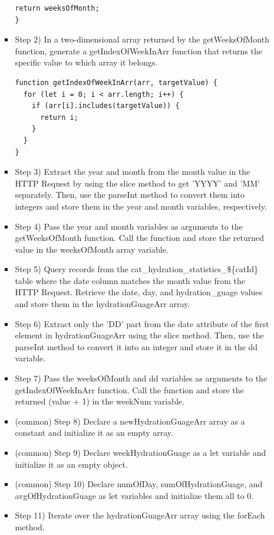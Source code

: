 \documentclass[conference]{IEEEtran}
\begin{document}
\begin{itemize}
\begin{itemize}
\begin{itemize}
\begin{lstlisting}[style=htmlcssjs]
  return weeksOfMonth;
}
            \end{lstlisting}
            \item Step 2) In a two-dimensional array returned by the getWeeksOfMonth function, generate a getIndexOfWeekInArr function that returns the specific value to which array it belongs.
            \begin{lstlisting}[style=htmlcssjs]
function getIndexOfWeekInArr(arr, targetValue) {
  for (let i = 0; i < arr.length; i++) {
    if (arr[i].includes(targetValue)) {
      return i;
    }
  }
}
            \end{lstlisting}
            \item Step 3) Extract the year and month from the month value in the HTTP Request by using the slice method to get 'YYYY' and 'MM' separately. Then, use the parseInt method to convert them into integers and store them in the year and month variables, respectively.
            \item Step 4) Pass the year and month variables as arguments to the getWeeksOfMonth function. Call the function and store the returned value in the weeksOfMonth array variable.
            \item Step 5) Query records from the cat\_hydration\_statistics\_\$\{catId\} table where the date column matches the month value from the HTTP Request. Retrieve the date, day, and hydration\_guage values and store them in the hydrationGuageArr array.
            \item Step 6) Extract only the 'DD' part from the date attribute of the first element in hydrationGuageArr using the slice method. Then, use the parseInt method to convert it into an integer and store it in the dd variable.
            \item Step 7) Pass the weeksOfMonth and dd variables as arguments to the getIndexOfWeekInArr function. Call the function and store the returned (value + 1) in the weekNum variable.
            \item (common) Step 8) Declare a newHydrationGuageArr array as a constant and initialize it as an empty array.
            \item (common) Step 9) Declare weekHydrationGuage as a let variable and initialize it as an empty object.
            \item (common) Step 10) Declare numOfDay, sumOfHydrationGuage, and avgOfHydrationGuage as let variables and initialize them all to 0.
            \item Step 11) Iterate over the hydrationGuageArr array using the forEach method.

\end{itemize}
\end{itemize}
\end{itemize}
\end{document}
